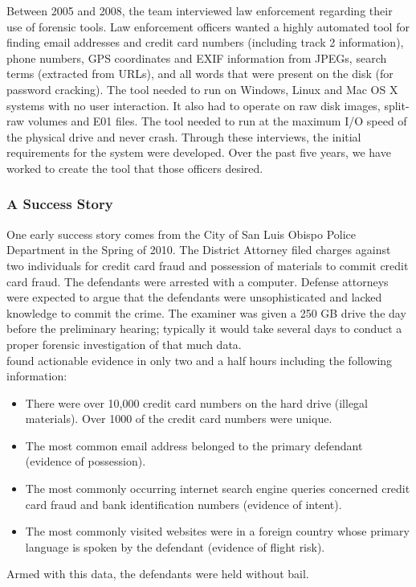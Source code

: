 \documentclass[11pt]{article} %
\begin{document}
Between 2005 and 2008, the \bulk team interviewed law enforcement regarding their use of forensic tools. Law enforcement officers wanted a highly automated tool for finding email addresses and credit card numbers (including track 2 information), phone numbers, GPS coordinates and EXIF information from JPEGs, search terms (extracted from URLs), and all words that were present on the disk (for password cracking). The tool needed to run on Windows, Linux and Mac OS X systems with no user interaction. It also had to operate on raw disk images, split-raw volumes and E01 files. The tool needed to run at the maximum I/O speed of the physical drive and never crash. Through these interviews, the initial  requirements for the \bulk system were developed. Over the past five years, we have worked to create the tool that those officers desired. \\

\subsubsection{A \bulk Success Story}
One early \bulk success story comes from the City of San Luis Obispo Police Department in the Spring of 2010. The District Attorney filed charges against two individuals for credit card fraud and possession of materials to commit credit card fraud. The defendants were arrested with a computer. Defense attorneys were expected to argue that the defendants were unsophisticated and lacked knowledge to commit the crime. The examiner was given a 250 GB drive the day before the preliminary hearing; typically it would take several days to conduct a proper forensic investigation of that much data.\\

\bulk found actionable evidence in only two and a half hours including the following information:
\begin{itemize}
\item There were over 10,000 credit card numbers on the hard drive (illegal materials).  Over 1000 of the credit card numbers were unique. 
\item The most common email address belonged to the primary defendant (evidence of possession). 
\item The most commonly occurring internet search engine queries concerned credit card fraud and bank identification numbers (evidence of intent). 
\item The most commonly visited websites were in a foreign country whose primary language is spoken by the defendant (evidence of flight risk). 
\end{itemize}
Armed with this data, the defendants were held without bail.\\
\end{document}
